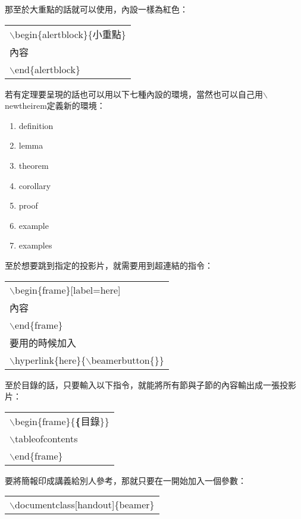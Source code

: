 \documentclass[12pt, a4paper]{article}
\begin{document}
那至於大重點的話就可以使用，內設一樣為紅色：
\begin{center}\colorbox{slight}{\begin{tabular}{p{}}
	$\backslash$begin\{alertblock\}\{小重點\}\\
	內容\\
	$\backslash$end\{alertblock\}\\
\end{tabular}}
\end{center}
若有定理要呈現的話也可以用以下七種內設的環境，當然也可以自己用$\backslash$newtheirem定義新的環境：
\begin{enumerate}
\item definition
\item lemma
\item theorem
\item corollary
\item proof
\item example
\item examples
\end{enumerate}
至於想要跳到指定的投影片，就需要用到超連結的指令：
\begin{center}\colorbox{slight}{\begin{tabular}{p{}}
    $\backslash$begin\{frame\}[label=here]\\
    內容\\
    $\backslash$end\{frame\}\\
    要用的時候加入\\
    $\backslash$hyperlink\{here\}\{$\backslash$beamerbutton\{\}\}\\
\end{tabular}}
\end{center}
至於目錄的話，只要輸入以下指令，就能將所有節與子節的內容輸出成一張投影片：
\begin{center}\colorbox{slight}{\begin{tabular}{p{}}
    $\backslash$begin\{frame\}\{\textbf\{目錄\}\}\\
	$\backslash$tableofcontents\\
    $\backslash$end\{frame\}\\
\end{tabular}}
\end{center}
要將簡報印成講義給別人參考，那就只要在一開始加入一個參數：
\begin{center}\colorbox{slight}{\begin{tabular}{p{}}
    $\backslash$documentclass[handout]\{beamer\}
\end{tabular}}
\end{center}
\end{document}

